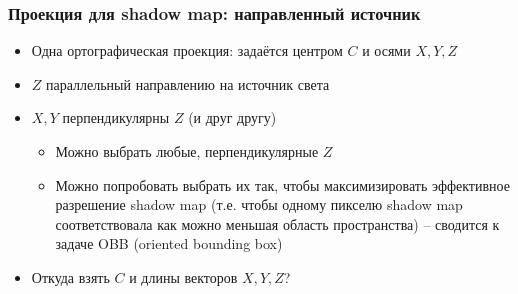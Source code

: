 \documentclass[10pt]{beamer}
\begin{document}
\begin{frame}[fragile]
\frametitle{Проекция для shadow map: направленный источник}
\begin{itemize}
\item Одна ортографическая проекция: задаётся центром \begin{math}C\end{math} и осями \begin{math}X, Y, Z\end{math}
\pause
\item \begin{math}Z\end{math} параллельный направлению на источник света
\pause
\item \begin{math}X, Y\end{math} перпендикулярны \begin{math}Z\end{math} (и друг другу)
\begin{itemize}
\item Можно выбрать любые, перпендикулярные \begin{math}Z\end{math}
\item Можно попробовать выбрать их так, чтобы максимизировать эффективное разрешение shadow map (т.е. чтобы одному пикселю shadow map соответствовала как можно меньшая область пространства) -- сводится к задаче OBB (oriented bounding box)
\end{itemize}
\pause
\item Откуда взять \begin{math}C\end{math} и длины векторов \begin{math}X,Y,Z\end{math}?
\end{itemize}
\end{frame}
\end{document}
